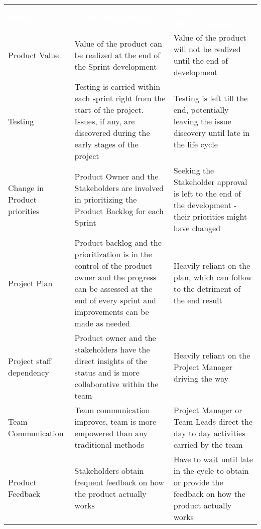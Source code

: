 \documentclass[a4paper]{article}
\begin{document}
	\begin{center}
		
		
	{
	\setlength{\extrarowheight}{2pt}
	
		
		\newcolumntype{b}{X}
		
		
		\begin{tabularx}{\textwidth}{ s t t }
			
			
			{ \textbf{\textcolor{white}{Factors \newline}}} & {\textbf{\textcolor{white}{Scrum Methodology}}} & \textbf{\textcolor{white}{Other Methodologies}} \\
			
			 Product Value & Value of the product can be realized at the end of the Sprint development & Value of the product will not be realized until the end of development  \\
			
			
			Testing & Testing is carried within each sprint right from the start of the project. Issues, if any, are discovered during the early stages of the project & Testing is left till the end, potentially leaving the issue discovery until late in the life cycle  \\
			
			
			Change in Product priorities & Product Owner and the Stakeholders are involved in prioritizing the Product Backlog for each Sprint & Seeking the Stakeholder approval is left to the end of the development - their priorities might have changed \\
			
			
			Project Plan & Product backlog and the prioritization is in the control of the product owner and the progress can be assessed at the end of every sprint and improvements can be made as needed & Heavily reliant on the plan, which can follow to the detriment of the end result \\
			
			
			Project staff dependency & Product owner and the stakeholders have the direct insights of the status and is more collaborative within the team & Heavily reliant on the Project Manager driving the way \\
			
			
			Team Communication &
			Team communication improves, team is more empowered than any traditional methods &
			Project Manager or Team Leads direct the day to day activities carried by the team \\
			
			
			Product Feedback &
			Stakeholders obtain frequent feedback on how the product actually works &
			Have to wait until late in the cycle to obtain or provide the feedback on how the product actually works \\
		\end{tabularx}
	}
	\end{center}
	
\end{document}
